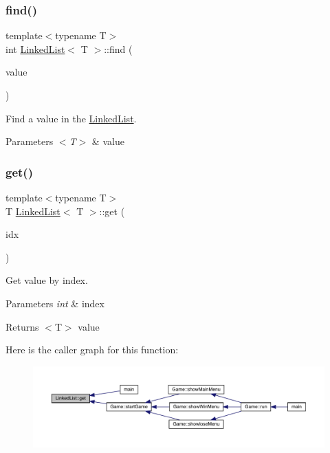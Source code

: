 \subsubsection{\texorpdfstring{find()}{find()}}
{\footnotesize\ttfamily template$<$typename T$>$ \\
int \mbox{\hyperlink{class_linked_list}{Linked\+List}}$<$ T $>$\+::find (\begin{DoxyParamCaption}\item[{T}]{value }\end{DoxyParamCaption})\hspace{0.3cm}{\ttfamily [inline]}}



Find a value in the \mbox{\hyperlink{class_linked_list}{Linked\+List}}. 


\begin{DoxyParams}{Parameters}
{\em $<$\+T$>$} & value \\
\hline
\end{DoxyParams}
\mbox{\label{class_linked_list_a5ca21e769005d1b3af2a2d2bb3313c98}} 
\subsubsection{\texorpdfstring{get()}{get()}}
{\footnotesize\ttfamily template$<$typename T$>$ \\
T \mbox{\hyperlink{class_linked_list}{Linked\+List}}$<$ T $>$\+::get (\begin{DoxyParamCaption}\item[{int}]{idx }\end{DoxyParamCaption})\hspace{0.3cm}{\ttfamily [inline]}}



Get value by index. 


\begin{DoxyParams}{Parameters}
{\em int} & index \\
\hline
\end{DoxyParams}
\begin{DoxyReturn}{Returns}
$<$\+T$>$ value 
\end{DoxyReturn}
Here is the caller graph for this function\+:
\nopagebreak
\begin{figure}[H]
\begin{center}
\leavevmode
\includegraphics[width=350pt]{class_linked_list_a5ca21e769005d1b3af2a2d2bb3313c98_icgraph}
\end{center}
\end{figure}
\mbox{\label{class_linked_list_aa4614ce35a543b74afb3c5bff8b018d4}} 
